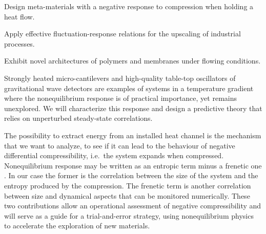 \begin{workpackage}[id=WPcompress,wphases=0-48,
  short=Nonequilibrium compressibility, %
  title=Nonequilibrium compressibility, %
  lead=UNIPD,
  UNIPDRM=72,
  KULRM=12]

\newrefsection

\begin{wpobjectives}
  \begin{compactitem}
  \item Design meta-materials with a negative response to compression when holding a heat flow.
  \item Apply effective fluctuation-response relations for the upscaling of industrial processes.
  \item Exhibit novel architectures of polymers and membranes under flowing conditions.
  \end{compactitem}
\end{wpobjectives}

\begin{wpdescription}

Strongly heated micro-cantilevers \cite{AGBB15} and high-quality table-top oscillators of
gravitational wave detectors \cite{Cet13} are examples of systems in a temperature gradient
where the nonequilibrium response is of practical importance, yet remains unexplored.
%
We will characterize this response and design a predictive theory that relies on unperturbed
steady-state correlations.

The possibility to extract energy from an installed heat channel is the mechanism that we want to
analyze, to see if it can lead to the behaviour of negative differential compressibility,
i.e.~the system expands when compressed. 
Nonequilibrium response may be written as an entropic term minus a frenetic one \cite{BMW09}.
In our case the former is the correlation between the size of the system and the entropy produced by the compression.
The frenetic term is another correlation between size and dynamical aspects that can be monitored numerically.
%
These two contributions allow an operational assessment of negative compressibility and will
serve as a guide for a trial-and-error strategy, using nonequilibrium physics to accelerate the
exploration of new materials.


\end{wpdescription}
\end{workpackage}
